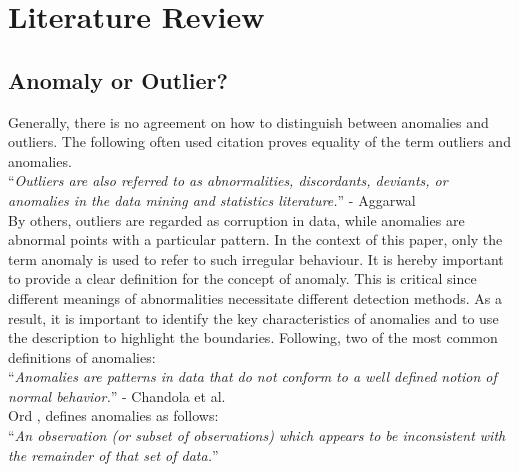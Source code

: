 
\chapter{Literature Review} %

\label{2.} %


\section{Anomaly or Outlier?}

Generally, there is no agreement on how to distinguish between anomalies and outliers. The following often used citation proves equality of the term outliers and anomalies.\\

\noindent\enquote{\itshape Outliers are also referred to as abnormalities, discordants, deviants, or anomalies in the data mining
	and statistics literature.} - Aggarwal \parencite*{Aggarwal2013}\\

By others, outliers are regarded as corruption in data, while anomalies are abnormal points with a particular pattern. 
In the context of this paper, only the term anomaly is used to refer to such irregular behaviour. It is hereby important to provide a clear definition for the concept of anomaly. This is critical since different meanings of abnormalities necessitate different detection methods. As a result, it is important to identify the key characteristics of anomalies and to use the description to highlight the boundaries. Following, two of the most common definitions of anomalies:\\

\noindent\enquote{\itshape Anomalies are patterns in data that do not conform to a well defined notion of normal behavior.} - Chandola et al. \parencite*{Chandola2009}\\

Ord \parencite*{Ord1996}, defines anomalies as follows:\\

\noindent\enquote{\itshape An observation (or subset of observations) which appears to be inconsistent with the remainder of that set of data.}\\

